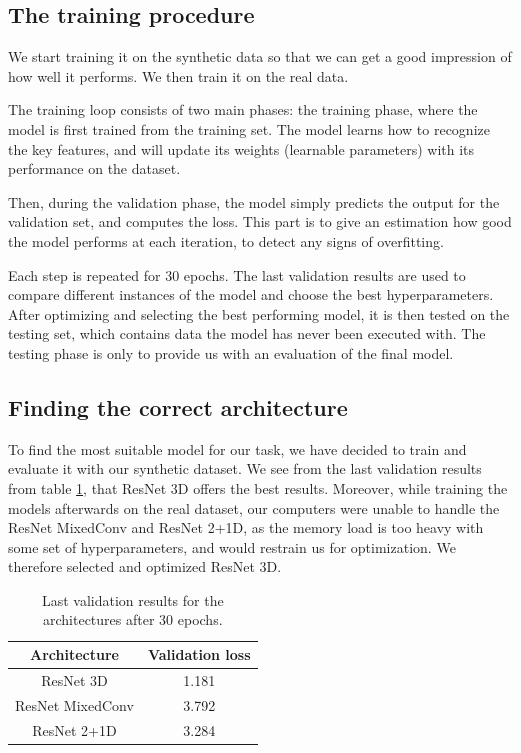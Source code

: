 \documentclass[10pt,conference]{IEEEtran}
\begin{document}
\subsection{The training procedure}
We start training it on the synthetic data so that we can get a good impression of how well it performs. We then train it on the real data.\par 
The training loop consists of two main phases: the training phase, where the model is first trained from the training set. The model learns how to recognize the key features, and will update its weights (learnable parameters) with its performance
on the dataset. \par 
Then, during the validation phase, the model simply predicts the output for the validation set, and computes the loss. This part is to give an estimation how good the model performs at each iteration, to detect any signs of overfitting. \par
Each step is repeated for 30 epochs. The last validation results are used to compare different instances of the model and choose the best hyperparameters. After optimizing and selecting the best performing model, it is then tested on the testing set, which contains data the model has never been executed with. The testing phase is only to provide us with an evaluation of the final model.



\subsection{Finding the correct architecture}
To find the most suitable model for our task, we have decided to train and evaluate it with our synthetic dataset. We see from the last validation results from table \ref{table:comparisonLoss}, that ResNet 3D offers the best results. Moreover, while training the models afterwards on the real dataset, our computers were unable to handle the ResNet MixedConv and ResNet 2+1D, as the memory load is too heavy with some set of hyperparameters, and would restrain us for optimization. We therefore selected and optimized ResNet 3D. 

\begin{table}[h!]
\centering
 \begin{tabular}{|c | c |} 
 \hline
    Architecture & Validation loss \\  
 \hline\hline
    ResNet 3D & 1.181\\ 
 \hline
    ResNet MixedConv & 3.792\\
 \hline
    ResNet 2+1D & 3.284\\
 \hline
\end{tabular}
\caption{Last validation results for the architectures after 30 epochs.}
\label{table:comparisonLoss}
\end{table}
\end{document}
